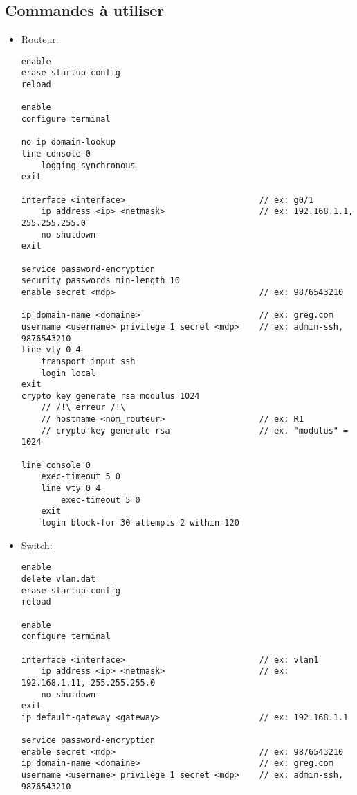 \documentclass[a4paper]{article}
\begin{document}
\newpage \subsection{Commandes à utiliser}





\begin{itemize}





\item Routeur:
\begin{verbatim}
enable
erase startup-config
reload

enable
configure terminal

no ip domain-lookup
line console 0
    logging synchronous
exit

interface <interface>                           // ex: g0/1
    ip address <ip> <netmask>                   // ex: 192.168.1.1, 255.255.255.0
    no shutdown
exit

service password-encryption
security passwords min-length 10
enable secret <mdp>                             // ex: 9876543210

ip domain-name <domaine>                        // ex: greg.com
username <username> privilege 1 secret <mdp>    // ex: admin-ssh, 9876543210
line vty 0 4
    transport input ssh
    login local
exit
crypto key generate rsa modulus 1024
    // /!\ erreur /!\
    // hostname <nom_routeur>                   // ex: R1
    // crypto key generate rsa                  // ex. "modulus" = 1024

line console 0
    exec-timeout 5 0
    line vty 0 4
        exec-timeout 5 0
    exit
    login block-for 30 attempts 2 within 120
\end{verbatim}





\newpage \item Switch:
\begin{verbatim}
enable
delete vlan.dat
erase startup-config
reload

enable
configure terminal

interface <interface>                           // ex: vlan1
    ip address <ip> <netmask>                   // ex: 192.168.1.11, 255.255.255.0
    no shutdown
exit
ip default-gateway <gateway>                    // ex: 192.168.1.1

service password-encryption
enable secret <mdp>                             // ex: 9876543210
ip domain-name <domaine>                        // ex: greg.com
username <username> privilege 1 secret <mdp>    // ex: admin-ssh, 9876543210


\end{verbatim}
\end{itemize}
\end{document}
